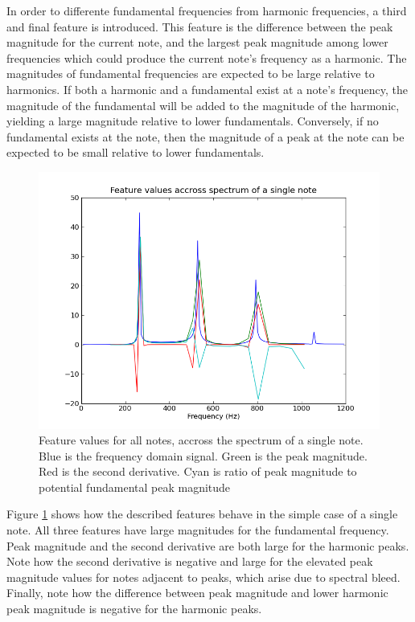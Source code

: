 \documentclass[twocolumn]{article}
\begin{document}
In order to differente fundamental frequencies from harmonic frequencies, a third and final feature is introduced.  This feature is the difference between the peak magnitude for the current note, and the largest peak magnitude among lower frequencies which could produce the current note's frequency as a harmonic.  The magnitudes of fundamental frequencies are expected to be large relative to harmonics.  If both a harmonic and a fundamental exist at a note's frequency, the magnitude of the fundamental will be added to the magnitude of the harmonic, yielding a large magnitude relative to lower fundamentals.  Conversely, if no fundamental exists at the note, then the magnitude of a peak at the note can be expected to be small relative to lower fundamentals.

\begin{figure}
 \includegraphics[scale=0.39]{features.png}
 \caption{Feature values for all notes, accross the spectrum of a single note.  Blue is the frequency domain signal.  Green is the peak magnitude.  Red is the second derivative.  Cyan is ratio of peak magnitude to potential fundamental peak magnitude}
 \label{features}
\end{figure}

Figure \ref{features} shows how the described features behave in the simple case of a single note.  All three features have large magnitudes for the fundamental frequency.  Peak magnitude and the second derivative are both large for the harmonic peaks.  Note how the second derivative is negative and large for the elevated peak magnitude values for notes adjacent to peaks, which arise due to spectral bleed.  Finally, note how the difference between peak magnitude and lower harmonic peak magnitude is negative for the harmonic peaks.
\end{document}
